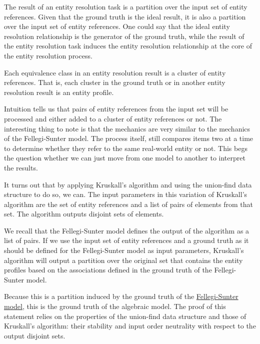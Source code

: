 \documentclass[lettersize,journal]{IEEEtran}
\begin{document}
    The result of an entity resolution task is a partition over the input set of
    entity references.
    Given that the ground truth is the ideal result, it is also a partition over
    the input set of entity references.
    One could say that the ideal entity resolution relationship is the generator
    of the ground truth, while the result of the entity resolution task induces
    the entity resolution relationship at the core of the entity resolution
    process.
    
    Each equivalence class in an entity resolution result is a cluster of entity
    references.
    That is, each cluster in the ground truth or in another entity resolution
    result is an entity profile.

    Intuition tells us that pairs of entity references from the input set will
    be processed and either added to a cluster of entity references or not.
    The interesting thing to note is that the mechanics are very similar to
    the mechanics of the Fellegi-Sunter model.
    The process itself, still compares items two at a time to determine whether
    they refer to the same real-world entity or not.
    This begs the question whether we can just move from one model to another
    to interpret the results.

    It turns out that by applying Kruskall's algorithm and using the union-find
    data structure to do so, we can.
    The input parameters in this variation of Kruskall's algorithm are the set
    of entity references and a list of pairs of elements from that set.
    The algorithm outputs disjoint sets of elements.

    We recall that the Fellegi-Sunter model defines the output of the algorithm
    as a list of pairs.
    If we use the input set of entity references and a ground truth as it should
    be defined for the Fellegi-Sunter model as input parameters, Kruskall's
    algorithm will output a partition over the original set that contains the
    entity profiles based on the associations defined in the ground truth of the
    Fellegi-Sunter model.

    Because this is a partition induced by the ground truth of the
    \hyperref[subsec:fsm]{Fellegi-Sunter model}, this is the ground truth of the
    algebraic model.
    The proof of this statement relies on the properties of the union-find data
    structure and those of Kruskall's algorithm: their stability and input order
    neutrality with respect to the output disjoint sets.
\end{document}
